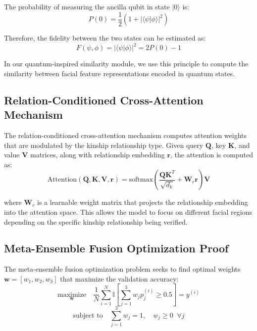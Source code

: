 \documentclass[journal,12pt]{IEEEtran}
\begin{document}
The probability of measuring the ancilla qubit in state $|0\rangle$ is:
\begin{equation}
    P(0) = \frac{1}{2} \left(1 + |\langle\psi|\phi\rangle|^2\right)
\end{equation}

Therefore, the fidelity between the two states can be estimated as:
\begin{equation}
    F(\psi,\phi) = |\langle\psi|\phi\rangle|^2 = 2P(0) - 1
\end{equation}

In our quantum-inspired similarity module, we use this principle to
compute the similarity between facial feature representations encoded
in quantum states.

\subsection{Relation-Conditioned Cross-Attention Mechanism}
The relation-conditioned cross-attention mechanism computes attention
weights that are modulated by the kinship relationship type. Given query
$\mathbf{Q}$, key $\mathbf{K}$, and value $\mathbf{V}$ matrices, along
with relationship embedding $\mathbf{r}$, the attention is computed as:
\begin{equation}
    \text{Attention}(\mathbf{Q}, \mathbf{K}, \mathbf{V}, \mathbf{r}) =
    \text{softmax}\!\left(\frac{\mathbf{Q}\mathbf{K}^T}{\sqrt{d_k}} +
    \mathbf{W}_r\mathbf{r}\right)\mathbf{V}
\end{equation}

where $\mathbf{W}_r$ is a learnable weight matrix that projects the
relationship embedding into the attention space. This allows the model
to focus on different facial regions depending on the specific kinship
relationship being verified.

\subsection{Meta-Ensemble Fusion Optimization Proof}
The meta-ensemble fusion optimization problem seeks to find optimal
weights $\mathbf{w} = [w_1, w_2, w_3]$ that maximize the validation
accuracy:
\begin{equation}
    \underset{\mathbf{w}}{\text{maximize}} \quad \frac{1}{N}\sum_{i=1}^{N}
    \mathbb{I}\!\left[\sum_{j=1}^{3} w_j p_j^{(i)} \geq 0.5\right] = y^{(i)}
\end{equation}
\begin{equation}
    \text{subject to} \quad \sum_{j=1}^{3} w_j = 1, \quad w_j \geq 0 \;\; \forall j
\end{equation}
\end{document}
